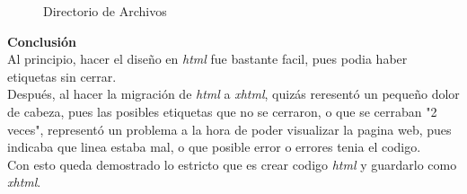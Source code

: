 \documentclass[12pt,letterpaper, spanish]{article}
\begin{document}
\begin{flushleft}
\begin{center}
\begin{figure}[h!]
{\em{\caption {Directorio de Archivos}}}\label{figura 12}
\end{figure}
\end{center}
\vspace{-1cm}
\newpage
{\Huge{\rm {\bf Conclusi\'on}}}
\\
\vspace{5mm}
Al principio, hacer el dise\~no en {\em html} fue bastante facil, pues podia haber etiquetas sin cerrar.\\
\vspace{5mm}
Despu\'es, al hacer la migraci\'on de {\em html} a {\em xhtml}, quiz\'as reresent\'o un peque\~no dolor de cabeza, pues las posibles etiquetas que no se cerraron, o que se cerraban "2 veces", represent\'o un problema a la hora de poder visualizar la pagina web, pues indicaba que linea estaba mal, o que posible error o errores tenia el codigo.
\\
\vspace{5mm}
Con esto queda demostrado lo estricto que es crear codigo {\em html} y guardarlo como {\em xhtml}.


\end{flushleft}

\end{document}
